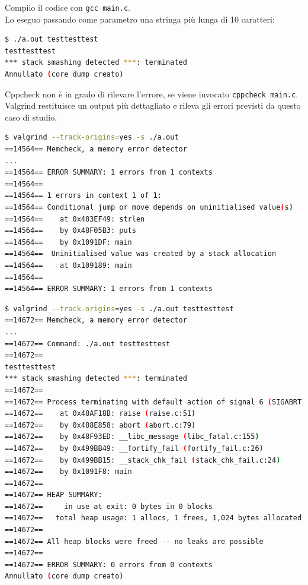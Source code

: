 \documentclass{article}
\begin{document}
Compilo il codice con \texttt{gcc main.c}. \\

Lo eseguo passando come parametro una stringa più lunga di 10 caratteri:

\begin{lstlisting}[language=bash]
$ ./a.out testtesttest
testtesttest
*** stack smashing detected ***: terminated
Annullato (core dump creato)
\end{lstlisting}

Cppcheck non è in grado di rilevare l'errore, se viene invocato \texttt{cppcheck
main.c}. \\

Valgrind restituisce un output più dettagliato e rileva gli errori previsti da
questo caso di studio.

\begin{lstlisting}[language=bash]
$ valgrind --track-origins=yes -s ./a.out 
==14564== Memcheck, a memory error detector
...
==14564== ERROR SUMMARY: 1 errors from 1 contexts 
==14564== 
==14564== 1 errors in context 1 of 1:
==14564== Conditional jump or move depends on uninitialised value(s)
==14564==    at 0x483EF49: strlen
==14564==    by 0x48F05B3: puts
==14564==    by 0x1091DF: main
==14564==  Uninitialised value was created by a stack allocation
==14564==    at 0x109189: main
==14564== 
==14564== ERROR SUMMARY: 1 errors from 1 contexts 
\end{lstlisting}

\begin{lstlisting}[language=bash]
$ valgrind --track-origins=yes -s ./a.out testtesttest
==14672== Memcheck, a memory error detector
...
==14672== Command: ./a.out testtesttest
==14672== 
testtesttest
*** stack smashing detected ***: terminated
==14672== 
==14672== Process terminating with default action of signal 6 (SIGABRT)
==14672==    at 0x48AF18B: raise (raise.c:51)
==14672==    by 0x488E858: abort (abort.c:79)
==14672==    by 0x48F93ED: __libc_message (libc_fatal.c:155)
==14672==    by 0x499BB49: __fortify_fail (fortify_fail.c:26)
==14672==    by 0x499BB15: __stack_chk_fail (stack_chk_fail.c:24)
==14672==    by 0x1091F8: main
==14672== 
==14672== HEAP SUMMARY:
==14672==     in use at exit: 0 bytes in 0 blocks
==14672==   total heap usage: 1 allocs, 1 frees, 1,024 bytes allocated
==14672== 
==14672== All heap blocks were freed -- no leaks are possible
==14672== 
==14672== ERROR SUMMARY: 0 errors from 0 contexts 
Annullato (core dump creato)
\end{lstlisting}
\end{document}
